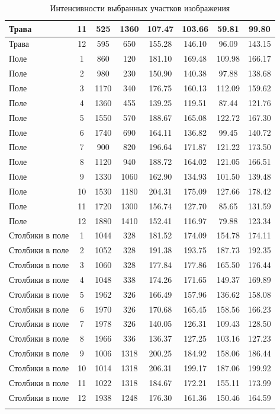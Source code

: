 \documentclass[a4paper,14pt]{extarticle}
\begin{document}
\begin{longtable}{|l|c|c|c|c|c|c|c|}
Трава & 11 & 525 & 1360 & 107.47 & 103.66 & 59.81 & 99.80 \\ \hline
Трава & 12 & 595 & 650 & 155.28 & 146.10 & 96.09 & 143.15 \\ \hline
Поле & 1 & 860 & 120 & 181.10 & 169.48 & 109.98 & 166.17 \\ \hline
Поле & 2 & 980 & 230 & 150.90 & 140.38 & 97.88 & 138.68 \\ \hline
Поле & 3 & 1170 & 340 & 176.75 & 160.13 & 112.09 & 159.62 \\ \hline
Поле & 4 & 1360 & 455 & 139.25 & 119.51 & 87.44 & 121.76 \\ \hline
Поле & 5 & 1550 & 570 & 188.67 & 165.08 & 122.72 & 167.30 \\ \hline
Поле & 6 & 1740 & 690 & 164.11 & 136.82 & 99.45 & 140.72 \\ \hline
Поле & 7 & 900 & 820 & 196.64 & 171.87 & 121.22 & 173.50 \\ \hline
Поле & 8 & 1120 & 940 & 188.72 & 164.02 & 121.05 & 166.51 \\ \hline
Поле & 9 & 1330 & 1060 & 162.90 & 134.93 & 101.50 & 139.48 \\ \hline
Поле & 10 & 1530 & 1180 & 204.31 & 175.09 & 127.66 & 178.42 \\ \hline
Поле & 11 & 1720 & 1300 & 156.74 & 127.70 & 85.65 & 131.59 \\ \hline
Поле & 12 & 1880 & 1410 & 152.41 & 116.97 & 79.88 & 123.34 \\ \hline
Столбики в поле & 1 & 1044 & 328 & 181.52 & 174.09 & 154.78 & 174.11 \\ \hline
Столбики в поле & 2 & 1052 & 328 & 191.38 & 193.75 & 187.73 & 192.35 \\ \hline
Столбики в поле & 3 & 1060 & 328 & 177.84 & 177.86 & 165.50 & 176.44 \\ \hline
Столбики в поле & 4 & 1048 & 338 & 174.26 & 171.65 & 149.37 & 169.89 \\ \hline
Столбики в поле & 5 & 1962 & 326 & 166.49 & 157.96 & 136.62 & 158.08 \\ \hline
Столбики в поле & 6 & 1970 & 326 & 170.68 & 165.45 & 158.56 & 166.23 \\ \hline
Столбики в поле & 7 & 1978 & 326 & 140.05 & 126.31 & 109.43 & 128.50 \\ \hline
Столбики в поле & 8 & 1966 & 336 & 136.37 & 127.25 & 103.16 & 127.23 \\ \hline
Столбики в поле & 9 & 1006 & 1318 & 200.25 & 184.92 & 158.06 & 186.44 \\ \hline
Столбики в поле & 10 & 1014 & 1318 & 206.31 & 199.17 & 187.06 & 199.92 \\ \hline
Столбики в поле & 11 & 1022 & 1318 & 184.67 & 172.21 & 155.11 & 173.99 \\ \hline
Столбики в поле & 12 & 1938 & 1248 & 176.30 & 161.36 & 150.46 & 164.59 \\ \hline
\caption{Интенсивности выбранных участков изображения}
\end{longtable}
\end{document}
